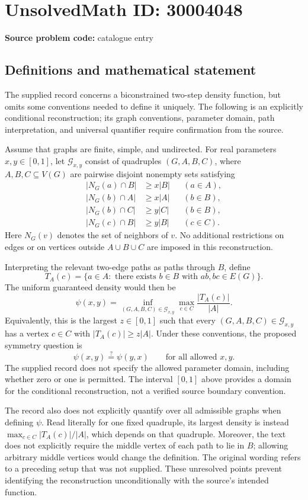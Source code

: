 \documentclass[11pt]{article}
\begin{document}
\section*{UnsolvedMath ID: 30004048}
\textbf{Source problem code:} catalogue entry
\subsection{Definitions and mathematical statement}
The supplied record concerns a biconstrained two-step density function, but omits some conventions needed to define it uniquely. The following is an explicitly conditional reconstruction; its graph conventions, parameter domain, path interpretation, and universal quantifier require confirmation from the source.

Assume that graphs are finite, simple, and undirected. For real parameters \(x,y\in[0,1]\), let \(\mathcal{G}_{x,y}\) consist of quadruples \((G,A,B,C)\), where \(A,B,C\subseteq V(G)\) are pairwise disjoint nonempty sets satisfying
\[
\begin{aligned}
|N_G(a)\cap B|&\ge x|B| &&(a\in A),\\
|N_G(b)\cap A|&\ge x|A| &&(b\in B),\\
|N_G(b)\cap C|&\ge y|C| &&(b\in B),\\
|N_G(c)\cap B|&\ge y|B| &&(c\in C).
\end{aligned}
\]
Here \(N_G(v)\) denotes the set of neighbors of \(v\). No additional restrictions on edges or on vertices outside \(A\cup B\cup C\) are imposed in this reconstruction.

Interpreting the relevant two-edge paths as paths through \(B\), define
\[
T_A(c)=\{a\in A:\text{ there exists }b\in B\text{ with }ab,bc\in E(G)\}.
\]
The uniform guaranteed density would then be
\[
\psi(x,y)=\inf_{(G,A,B,C)\in\mathcal{G}_{x,y}}
\max_{c\in C}\frac{|T_A(c)|}{|A|}.
\]
Equivalently, this is the largest \(z\in[0,1]\) such that every \((G,A,B,C)\in\mathcal{G}_{x,y}\) has a vertex \(c\in C\) with \(|T_A(c)|\ge z|A|\). Under these conventions, the proposed symmetry question is
\[
\psi(x,y)\stackrel{?}{=}\psi(y,x)
\qquad\text{for all allowed }x,y.
\]
The supplied record does not specify the allowed parameter domain, including whether zero or one is permitted. The interval \([0,1]\) above provides a domain for the conditional reconstruction, not a verified source boundary convention.

The record also does not explicitly quantify over all admissible graphs when defining \(\psi\). Read literally for one fixed quadruple, its largest density is instead \(\max_{c\in C}|T_A(c)|/|A|\), which depends on that quadruple. Moreover, the text does not explicitly require the middle vertex of each path to lie in \(B\); allowing arbitrary middle vertices would change the definition. The original wording refers to a preceding setup that was not supplied. These unresolved points prevent identifying the reconstruction unconditionally with the source's intended function.
\end{document}
